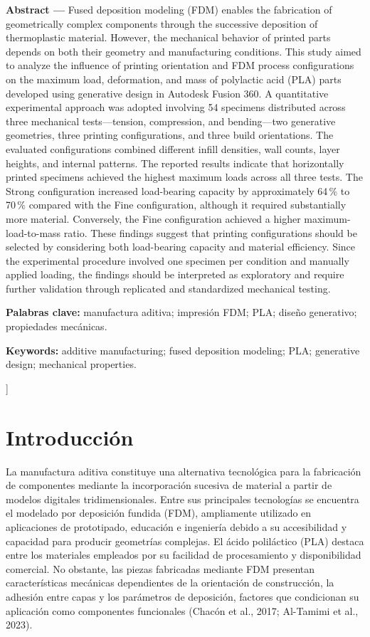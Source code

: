 \documentclass[10pt,twocolumn]{article}
\begin{document}
{\begin{tcolorbox}[colback=white,colframe=navy!55,boxrule=0.5pt,arc=1pt,left=5pt,right=5pt,top=3pt,bottom=3pt]
\small\textbf{Abstract ---} Fused deposition modeling (FDM) enables the fabrication of geometrically complex components through the successive deposition of thermoplastic material. However, the mechanical behavior of printed parts depends on both their geometry and manufacturing conditions. This study aimed to analyze the influence of printing orientation and FDM process configurations on the maximum load, deformation, and mass of polylactic acid (PLA) parts developed using generative design in Autodesk Fusion 360. A quantitative experimental approach was adopted involving 54 specimens distributed across three mechanical tests---tension, compression, and bending---two generative geometries, three printing configurations, and three build orientations. The evaluated configurations combined different infill densities, wall counts, layer heights, and internal patterns. The reported results indicate that horizontally printed specimens achieved the highest maximum loads across all three tests. The Strong configuration increased load-bearing capacity by approximately 64\,\% to 70\,\% compared with the Fine configuration, although it required substantially more material. Conversely, the Fine configuration achieved a higher maximum-load-to-mass ratio. These findings suggest that printing configurations should be selected by considering both load-bearing capacity and material efficiency. Since the experimental procedure involved one specimen per condition and manually applied loading, the findings should be interpreted as exploratory and require further validation through replicated and standardized mechanical testing.

\small\textbf{Palabras clave:} manufactura aditiva; impresión FDM; PLA; diseño generativo; propiedades mecánicas.

\small\textbf{Keywords:} additive manufacturing; fused deposition modeling; PLA; generative design; mechanical properties.
\end{tcolorbox}
\vspace{6pt}
}]
\section{Introducción}
La manufactura aditiva constituye una alternativa tecnológica para la fabricación de componentes mediante la incorporación sucesiva de material a partir de modelos digitales tridimensionales. Entre sus principales tecnologías se encuentra el modelado por deposición fundida (FDM), ampliamente utilizado en aplicaciones de prototipado, educación e ingeniería debido a su accesibilidad y capacidad para producir geometrías complejas. El ácido poliláctico (PLA) destaca entre los materiales empleados por su facilidad de procesamiento y disponibilidad comercial. No obstante, las piezas fabricadas mediante FDM presentan características mecánicas dependientes de la orientación de construcción, la adhesión entre capas y los parámetros de deposición, factores que condicionan su aplicación como componentes funcionales (Chacón et al., 2017; Al-Tamimi et al., 2023).
\end{document}
